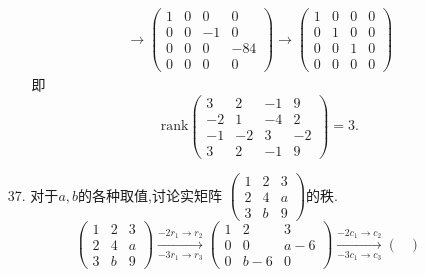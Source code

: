 \documentclass{article}
\begin{document}
\begin{enumerate}
\begin{enumerate}
\begin{align*}
                \longrightarrow
                \begin{pmatrix}
                    1 & 0 & 0 & 0\\
                    0 & 0 & -1 & 0\\
                    0 & 0 & 0 & -84\\
                    0 & 0 & 0 & 0
                \end{pmatrix}
                \longrightarrow
                \begin{pmatrix}
                    1 & 0 & 0 & 0\\
                    0 & 1 & 0 & 0\\
                    0 & 0 & 1 & 0\\
                    0 & 0 & 0 & 0
                \end{pmatrix}
            \end{align*}
            即\[
                \mbox{rank}\begin{pmatrix}
                    3  & 2 & -1 & 9\\
                    -2 & 1 & -4 & 2\\
                    -1 & -2& 3  & -2\\
                    3  & 2 & -1 & 9
                \end{pmatrix}=3.
            \]
        \end{enumerate}
        \item [37.]对于$a,b$的各种取值,讨论实矩阵
        $\begin{pmatrix}
            1 & 2 & 3\\
            2 & 4 & a\\
            3 & b & 9
        \end{pmatrix}$的秩.
        \[
            \begin{pmatrix}
                1 & 2 & 3\\
                2 & 4 & a\\
                3 & b & 9
            \end{pmatrix}
            \xrightarrow[-3r_1 \to r_3]{-2r_1 \to r_2}
            \begin{pmatrix}
                1 & 2 & 3\\
                0 & 0 & a-6\\
                0 & b-6 & 0
            \end{pmatrix}
            \xrightarrow[-3c_1 \to c_3]{-2c_1 \to c_2}
            \begin{pmatrix}

\end{pmatrix}\]
\end{enumerate}
\end{document}
